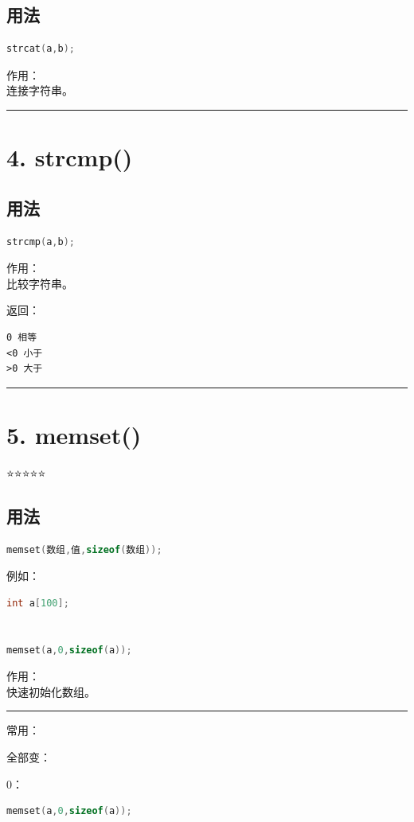 \documentclass[9pt,twocolumn]{extarticle}
\begin{document}
\subsection{用法}
\begin{lstlisting}[language=C++]
strcat(a,b);
\end{lstlisting}
作用：\\
连接字符串。

\noindent\rule{\linewidth}{0.4pt}

\section{4. strcmp()}

\subsection{用法}
\begin{lstlisting}[language=C++]
strcmp(a,b);
\end{lstlisting}
作用：\\
比较字符串。

返回：
\begin{lstlisting}
0 相等
<0 小于
>0 大于
\end{lstlisting}

\noindent\rule{\linewidth}{0.4pt}

\section{5. memset()}

⭐⭐⭐⭐⭐

\subsection{用法}
\begin{lstlisting}[language=C++]
memset(数组,值,sizeof(数组));
\end{lstlisting}
例如：
\begin{lstlisting}[language=C++]
int a[100];


memset(a,0,sizeof(a));
\end{lstlisting}
作用：\\
快速初始化数组。

\noindent\rule{\linewidth}{0.4pt}

常用：

全部变：

0：
\begin{lstlisting}[language=C++]
memset(a,0,sizeof(a));
\end{lstlisting}
\end{document}
